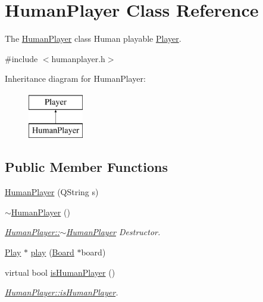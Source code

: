 \hypertarget{class_human_player}{\section{Human\-Player Class Reference}
\label{class_human_player}
}


The \hyperlink{class_human_player}{Human\-Player} class Human playable \hyperlink{class_player}{Player}.  




{\ttfamily \#include $<$humanplayer.\-h$>$}

Inheritance diagram for Human\-Player\-:\begin{figure}[H]
\begin{center}
\leavevmode
\includegraphics[height=2.000000cm]{class_human_player}
\end{center}
\end{figure}
\subsection*{Public Member Functions}
\begin{DoxyCompactItemize}
\item 
\hyperlink{class_human_player_aca695b2fb575e41bf7f015387c6eb52a}{Human\-Player} (Q\-String s)
\item 
\hyperlink{class_human_player_abdeb9d120fc74c8d82ec0c688883f16f}{$\sim$\-Human\-Player} ()
\begin{DoxyCompactList}\small\item\em \hyperlink{class_human_player_abdeb9d120fc74c8d82ec0c688883f16f}{Human\-Player\-::$\sim$\-Human\-Player} Destructor. \end{DoxyCompactList}\item 
\hyperlink{class_play}{Play} $\ast$ \hyperlink{class_human_player_acd62878a6a3612685aca20853bbca3e2}{play} (\hyperlink{class_board}{Board} $\ast$board)
\item 
virtual bool \hyperlink{class_human_player_aff784db8904c5f8c13bd88847f631188}{is\-Human\-Player} ()
\begin{DoxyCompactList}\small\item\em \hyperlink{class_human_player_aff784db8904c5f8c13bd88847f631188}{Human\-Player\-::is\-Human\-Player}. \end{DoxyCompactList}\end{DoxyCompactItemize}
